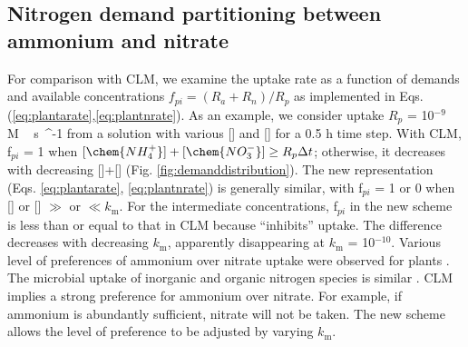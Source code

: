 \documentclass[gmd, manuscript]{copernicus}
\begin{document}
\subsection{Nitrogen demand partitioning between ammonium and nitrate}
For comparison with CLM, we examine the uptake rate as a function of demands
and available concentrations 
$f_{pi} = ({R_a + R_n})/{R_p}$ as implemented in Eqs. (\ref{eq:plantarate},\ref{eq:plantnrate}).
As an example, we consider uptake $R_p$ = 10$^{-9}$ \unit{M\,s{^{-1}}} from a
solution with various [] and [] for a 0.5 h time
step. With CLM, f$_{pi}$ = 1 when $[\chem{NH_4^+}]+[\chem{NO_3^-}]\geq
R_p\Delta t$; otherwise, it decreases with decreasing
[]+[] (Fig. \ref{fig:demanddistribution}). The new
representation (Eqs. \ref{eq:plantarate}, \ref{eq:plantnrate}) is generally
similar, with f$_{pi}$ = 1 or 0 when [] or [] $\gg$
or $\ll k_\text{m}$. For the intermediate concentrations, f$_{pi}$ in the new
scheme is less than or equal to that in CLM because  ``inhibits''
 uptake. The difference decreases with decreasing $k_\text{m}$,
apparently disappearing at $k_\text{m}$ = 10$^{-10}$. 
Various level of preferences of ammonium over nitrate uptake were observed for plants
\citep{Pfautsch2009,Warren2007,Nordin2001,Falkengren1995,Gherardi2013}. The
microbial uptake of inorganic and organic nitrogen species is similar
\citep{Fouilland2007,Kirchman1994,Kirchman1998,Middelburg2000,Veuger2004}. CLM
implies a strong preference for ammonium over nitrate. For example, if
ammonium is abundantly sufficient, nitrate will not be taken. The new scheme
allows the level of preference to be adjusted by varying $k_\text{m}$.
\end{document}
